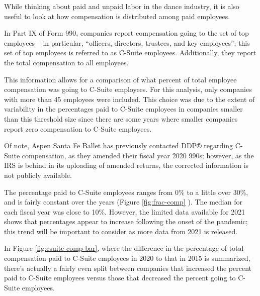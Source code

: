 \documentclass[Dance Data
Project,article,submit,moreauthors,pdftex]{mdpi}
\begin{document}
While thinking about paid and unpaid labor in the dance industry, it is
also useful to look at how compensation is distributed among paid
employees.

In Part IX of Form 990, companies report compensation going to the set
of top employees -- in particular, ``officers, directors, trustees, and
key employees''; this set of top employees is referred to as C-Suite
employees. Additionally, they report the total compensation to all
employees.

This information allows for a comparison of what percent of total
employee compensation was going to C-Suite employees. For this analysis,
only companies with more than 45 employees were included. This choice
was due to the extent of variability in the percentages paid to C-Suite
employees in companies smaller than this threshold size since there are
some years where smaller companies report zero compensation to C-Suite
employees.

Of note, Aspen Santa Fe Ballet has previously contacted DDP® regarding
C-Suite compensation, as they amended their fiscal year 2020 990s;
however, as the IRS is behind in its uploading of amended returns, the
corrected information is not publicly available.

The percentage paid to C-Suite employees ranges from 0\% to a little
over 30\%, and is fairly constant over the years (Figure
\ref{fig:frac-comp} ). The median for each fiscal year was close to
10\%. However, the limited data available for 2021 shows that
percentages appear to increase following the onset of the pandemic; this
trend will be important to consider as more data from 2021 is released.

In Figure \ref{fig:csuite-comp-bar}, where the difference in the
percentage of total compensation paid to C-Suite employees in 2020 to
that in 2015 is summarized, there's actually a fairly even split between
companies that increased the percent paid to C-Suite employees versus
those that decreased the percent going to C-Suite employees.
\end{document}
